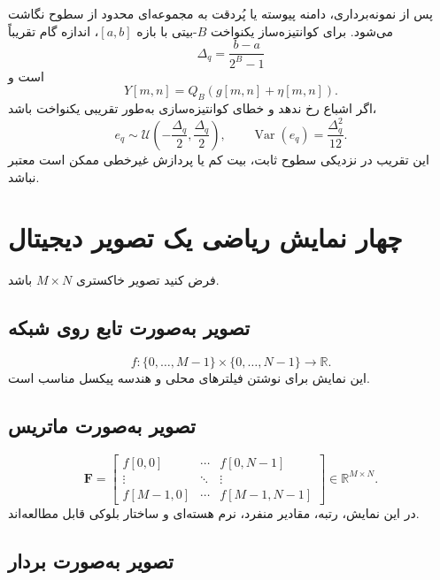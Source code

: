 \documentclass[12pt,openany,oneside]{book}
\newcommand{\R}{\mathbb{R}}
\newcommand{\vect}[1]{\bm{#1}}
\begin{document}
پس از نمونه‌برداری، دامنه پیوسته یا پُردقت به مجموعه‌ای محدود از سطوح نگاشت می‌شود.
برای کوانتیزه‌ساز یکنواخت \(B\)-بیتی با بازه \([a,b]\)، اندازه گام تقریباً
\begin{equation}
\Delta_q=\frac{b-a}{2^B-1}
\end{equation}
است و
\begin{equation}
Y[m,n]=Q_B(g[m,n]+\eta[m,n]).
\end{equation}
اگر اشباع رخ ندهد و خطای کوانتیزه‌سازی به‌طور تقریبی یکنواخت باشد،
\begin{equation}
e_q\sim\mathcal U\left(-\frac{\Delta_q}{2},\frac{\Delta_q}{2}\right),
\qquad \operatorname{Var}(e_q)=\frac{\Delta_q^2}{12}.
\end{equation}
این تقریب در نزدیکی سطوح ثابت، بیت کم یا پردازش غیرخطی ممکن است معتبر نباشد.

\section{چهار نمایش ریاضی یک تصویر دیجیتال}

فرض کنید تصویر خاکستری \(M\times N\) باشد.

\subsection{تصویر به‌صورت تابع روی شبکه}
\begin{equation}
f:\{0,\dots,M-1\}\times\{0,\dots,N-1\}\to\R.
\end{equation}
این نمایش برای نوشتن فیلترهای محلی و هندسه پیکسل مناسب است.

\subsection{تصویر به‌صورت ماتریس}
\begin{equation}
\vect F=
\begin{bmatrix}
f[0,0]&\cdots&f[0,N-1]\\
\vdots&\ddots&\vdots\\
f[M-1,0]&\cdots&f[M-1,N-1]
\end{bmatrix}\in\R^{M\times N}.
\end{equation}
در این نمایش، رتبه، مقادیر منفرد، نرم هسته‌ای و ساختار بلوکی قابل مطالعه‌اند.

\subsection{تصویر به‌صورت بردار}
\end{document}
